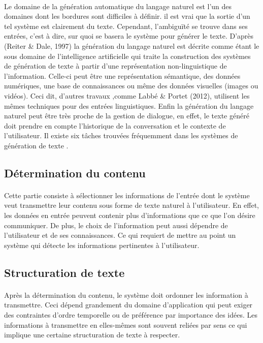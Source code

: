 	\paragraph{}
	Le domaine de la génération automatique du langage naturel est l’un des domaines dont les bordures sont difficiles à définir\cite{evans2002}. il est vrai que la sortie d’un tel système est clairement du texte. Cependant, l’ambiguïté se trouve dans ses entrées, c’est à dire, sur quoi se basera le système pour générer le texte. D’après (Reiter \& Dale, 1997)\cite{Reiter:1997} la génération du langage naturel est décrite comme étant le sous domaine de l’intelligence artificielle qui traite la construction des systèmes de génération de texte à partir d’une représentation non-linguistique de l’information. Celle-ci peut être une représentation sémantique, des données numériques, une base de connaissances ou même des données visuelles (images ou vidéos). Ceci dit, d’autres travaux ,comme Labbé \& Portet (2012)\cite{Labbé2012}, utilisent les mêmes techniques pour des entrées linguistiques. Enfin la génération du langage naturel peut être très proche de la gestion de dialogue\cite{Dethlefs2014}, en effet, le texte généré doit prendre en compte l’historique de la conversation et le contexte de l’utilisateur.\newline
	Il existe six tâches trouvées fréquemment dans les systèmes de génération de texte \cite{Reiter:1997}.
	
	\subsection{Détermination du contenu}
	\paragraph{}
	Cette partie consiste à sélectionner les informations de l’entrée dont le système veut transmettre leur contenu sous forme de texte naturel à l’utilisateur. En effet, les données en entrée peuvent contenir plus d’informations que ce que l’on désire communiquer\cite{Yu:2007}. De plus, le choix de l'information peut aussi dépendre de l’utilisateur et de ses connaissances\cite{Dethlefs2014}. Ce qui requiert de mettre au point un système qui détecte les informations pertinentes à l’utilisateur.
	\subsection{Structuration de texte}
	\paragraph{}
	Après la détermination du contenu, le système doit ordonner les information à transmettre. Ceci dépend grandement du domaine d’application qui peut exiger des contraintes d’ordre temporelle ou de préférence par importance des idées. Les informations à transmettre en elles-mêmes sont souvent reliées par sens ce qui implique une certaine structuration de texte à respecter.\newpage
